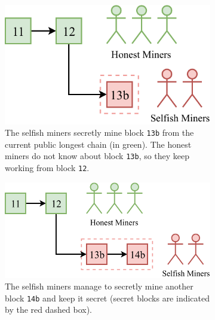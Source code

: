 \begin{figure}[h!]
	\begin{subfigure}{\textwidth}
		\centering
		\vspace*{0.25cm}
		\includegraphics[scale=0.9]{figures/selfish_1}
		\vspace*{0.25cm}
		\caption{
			The selfish miners secretly mine block \texttt{13b} from the current public longest chain (in green).
			The honest miners do not know about block \texttt{13b}, so they keep working from block \texttt{12}.
		}
		\vspace*{0.75cm}
	\end{subfigure}
	\begin{subfigure}{\textwidth}
		\centering
		\vspace*{0.25cm}
		\includegraphics[scale=0.9]{figures/selfish_2}
		\vspace*{0.25cm}
		\caption{The selfish miners manage to secretly mine another block \texttt{14b} and keep it secret (secret blocks are indicated by the red dashed box).}
		\vspace*{0.75cm}
	\end{subfigure}
	\begin{subfigure}{\textwidth}
		\centering
		\vspace*{0.25cm}

\end{subfigure}
\end{figure}
